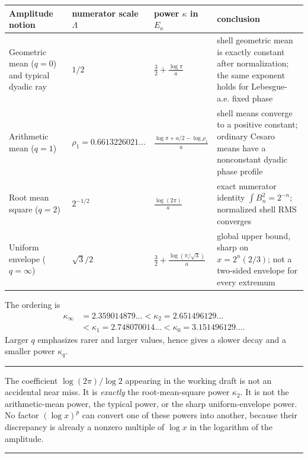 \documentclass[11pt,oneside]{article}
\theoremstyle{definition}
\theoremstyle{remark}
\newenvironment{boxedremark}{%
  \par\smallskip\noindent\begin{center}\begin{minipage}{0.94\textwidth}%
  \color{black}\hrule\vspace{0.6em}\small
}{%
  \vspace{0.6em}\hrule\end{minipage}\end{center}\smallskip
}
\begin{document}
\begin{center}
\begin{tabularx}{\textwidth}{@{}>{\raggedright\arraybackslash}p{}
  >{\centering\arraybackslash}p{}
  >{\centering\arraybackslash}p{}
  X@{}}
\toprule
Amplitude notion & numerator scale $\Lambda$ & power $\kappa$ in $E_\kappa$ & conclusion\\
\midrule
Geometric mean ($q=0$) and typical dyadic ray
 & $1/2$
 & $\displaystyle \frac32+\frac{\log\pi}{a}$
 & shell geometric mean is exactly constant after normalization; the same exponent holds
   for Lebesgue-a.e. fixed phase\\[0.7em]
Arithmetic mean ($q=1$)
 & $\rho_1=0.6613226021\ldots$
 & $\displaystyle \frac{\log\pi+a/2-\log\rho_1}{a}$
 & shell means converge to a positive constant; ordinary Cesaro means have a nonconstant
   dyadic phase profile\\[0.7em]
Root mean square ($q=2$)
 & $2^{-1/2}$
 & $\displaystyle \frac{\log(2\pi)}{a}$
 & exact numerator identity $\int B_n^2=2^{-n}$; normalized shell RMS converges\\[0.7em]
Uniform envelope ($q=\infty$)
 & $\sqrt3/2$
 & $\displaystyle \frac32+\frac{\log(\pi/\sqrt3)}{a}$
 & global upper bound, sharp on $x=2^n(2/3)$; not a two-sided envelope for every extremum\\
\bottomrule
\end{tabularx}
\end{center}

The ordering is
\begin{equation}
 \begin{aligned}
 \kappa_\infty&=2.359014879\ldots<\kappa_2=2.651496129\ldots\\
 &<\kappa_1=2.748070014\ldots<\kappa_0=3.151496129\ldots .
 \end{aligned}
 \label{eq:kappa-order}
\end{equation}
Larger $q$ emphasizes rarer and larger values, hence gives a slower decay and a smaller
power $\kappa_q$.

\begin{boxedremark}
The coefficient $\log(2\pi)/\log2$ appearing in the working draft is not an accidental
near miss.  It is \emph{exactly} the root-mean-square power $\kappa_2$.  It is not the
arithmetic-mean power, the typical power, or the sharp uniform-envelope power.  No factor
$(\log x)^p$ can convert one of these powers into another, because their discrepancy is
already a nonzero multiple of $\log x$ in the logarithm of the amplitude.
\end{boxedremark}
\end{document}
